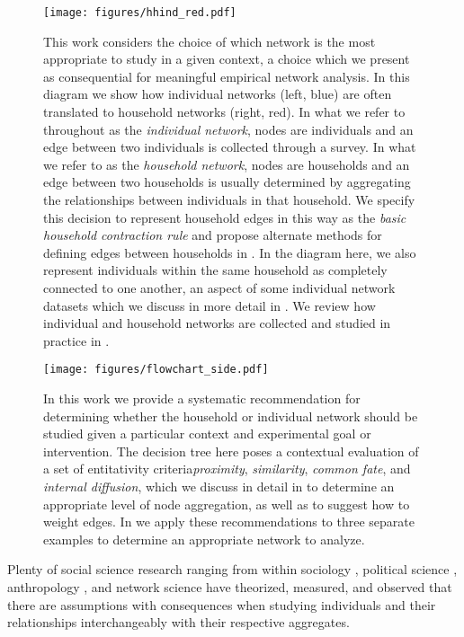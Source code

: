 \begin{figure}
    \centering
    \texttt{[image: figures/hhind\_red.pdf]}
    \caption{This work considers the choice of which network is the most appropriate to study in a given context, a choice which we present as consequential for meaningful empirical network analysis. In this diagram we show how individual networks (left, blue) are often translated to household networks (right, red). In what we refer to throughout as the \textit{individual network}, nodes are individuals and an edge between two individuals is collected through a survey. In what we refer to as the \textit{household network}, nodes are households and an edge between two households is usually determined by aggregating the relationships between individuals in that household. We specify this decision to represent household edges in this way as the \textit{basic household contraction rule} and propose alternate methods for defining edges between households in . In the diagram here, we also represent individuals within the same household as completely connected to one another, an aspect of some individual network datasets which we discuss in more detail in . We review how individual and household networks are collected and studied in practice in .}
    \label{fig:hh_ind_diagram}
\end{figure}

\begin{figure}
    \centering
    \texttt{[image: figures/flowchart\_side.pdf]}
    \caption{In this work we provide a systematic recommendation for determining whether the household or individual network should be studied given a particular context and experimental goal or intervention. The decision tree here poses a contextual evaluation of a set of entitativity criteria\textemdash \textit{proximity}, \textit{similarity}, \textit{common fate}, and \textit{internal diffusion}, which we discuss in detail in \textemdash to determine an appropriate level of node aggregation, as well as to suggest how to weight edges. In  we apply these recommendations to three separate examples to determine an appropriate network to analyze.}
    \label{fig:dec_chart}
\end{figure}

Plenty of social science research ranging from within sociology \citep{campbell1958common}, political science \citep{nickerson2008, auld2013inter, cheema2023canvassing}, anthropology \citep{werner1998, schmink1984household, niehof2011conceptualizing}, and network science \citep{kumar2024friendship} have theorized, measured, and observed that there are assumptions with consequences when studying individuals and their relationships interchangeably with their respective aggregates.

